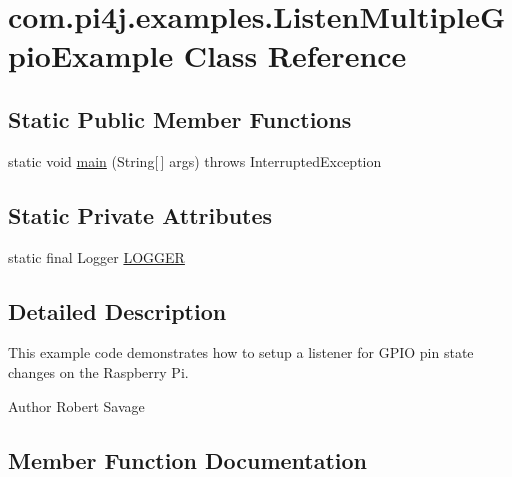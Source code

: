 \hypertarget{classcom_1_1pi4j_1_1examples_1_1ListenMultipleGpioExample}{}\section{com.\+pi4j.\+examples.\+Listen\+Multiple\+Gpio\+Example Class Reference}
\label{classcom_1_1pi4j_1_1examples_1_1ListenMultipleGpioExample}
\subsection*{Static Public Member Functions}
\begin{DoxyCompactItemize}
\item 
static void \hyperlink{classcom_1_1pi4j_1_1examples_1_1ListenMultipleGpioExample_a3d6b2b26105dee97222637a46edfb137}{main} (String\mbox{[}$\,$\mbox{]} args)  throws Interrupted\+Exception 
\end{DoxyCompactItemize}
\subsection*{Static Private Attributes}
\begin{DoxyCompactItemize}
\item 
static final Logger \hyperlink{classcom_1_1pi4j_1_1examples_1_1ListenMultipleGpioExample_a2ed4104703cde24426579ecec39f2a33}{L\+O\+G\+G\+E\+R}
\end{DoxyCompactItemize}


\subsection{Detailed Description}
This example code demonstrates how to setup a listener for G\+P\+I\+O pin state changes on the Raspberry Pi.

\begin{DoxyAuthor}{Author}
Robert Savage 
\end{DoxyAuthor}


\subsection{Member Function Documentation}
\hypertarget{classcom_1_1pi4j_1_1examples_1_1ListenMultipleGpioExample_a3d6b2b26105dee97222637a46edfb137}{}
